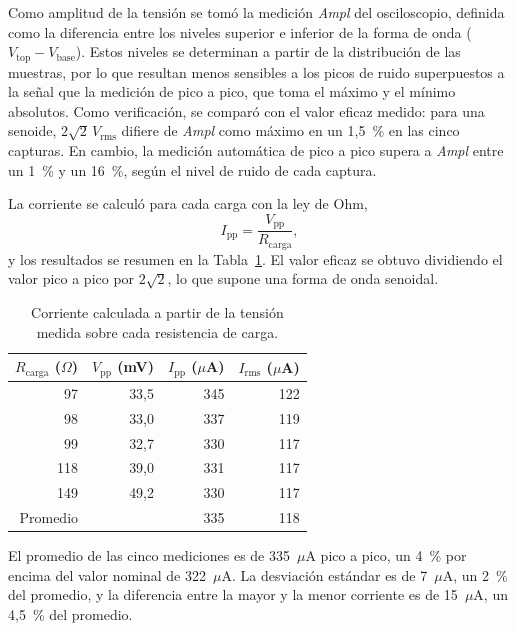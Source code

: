 \documentclass[12pt,a4paper]{article}
\begin{document}
Como amplitud de la tensión se tomó la medición \textit{Ampl} del osciloscopio, definida como la
diferencia entre los niveles superior e inferior de la forma de onda ($V_{\mathrm{top}}-V_{\mathrm{base}}$).
Estos niveles se determinan a partir de la distribución de las muestras, por lo que resultan menos
sensibles a los picos de ruido superpuestos a la señal que la medición de pico a pico, que toma
el máximo y el mínimo absolutos. Como verificación, se comparó con el valor eficaz medido: para
una senoide, $2\sqrt{2}\,V_{\mathrm{rms}}$ difiere de \textit{Ampl} como máximo en un 1,5~\% en las
cinco capturas. En cambio, la medición automática de pico a pico supera a \textit{Ampl} entre un
1~\% y un 16~\%, según el nivel de ruido de cada captura.

La corriente se calculó para cada carga con la ley de Ohm,
\begin{equation}
    I_{\mathrm{pp}}=\frac{V_{\mathrm{pp}}}{R_{\mathrm{carga}}},
\end{equation}
y los resultados se resumen en la Tabla~\ref{tab:corriente_cargas}. El valor eficaz se obtuvo
dividiendo el valor pico a pico por $2\sqrt{2}$, lo que supone una forma de onda senoidal.

\begin{table}[htbp]
    \centering
    \caption{Corriente calculada a partir de la tensión medida sobre cada resistencia de carga.}
    \label{tab:corriente_cargas}
    \begin{tabular}{rrrr}
        \hline
        $R_{\mathrm{carga}}$ ($\Omega$) & $V_{\mathrm{pp}}$ (mV) & $I_{\mathrm{pp}}$ ($\mu$A) & $I_{\mathrm{rms}}$ ($\mu$A) \\
        \hline
        97  & 33,5 & 345 & 122 \\
        98  & 33,0 & 337 & 119 \\
        99  & 32,7 & 330 & 117 \\
        118 & 39,0 & 331 & 117 \\
        149 & 49,2 & 330 & 117 \\
        \hline
        Promedio &  & 335 & 118 \\
        \hline
    \end{tabular}
\end{table}

El promedio de las cinco mediciones es de 335~$\mu$A pico a pico, un 4~\% por encima del valor
nominal de 322~$\mu$A. La desviación estándar es de 7~$\mu$A, un 2~\% del promedio, y la diferencia
entre la mayor y la menor corriente es de 15~$\mu$A, un 4,5~\% del promedio.
\end{document}

